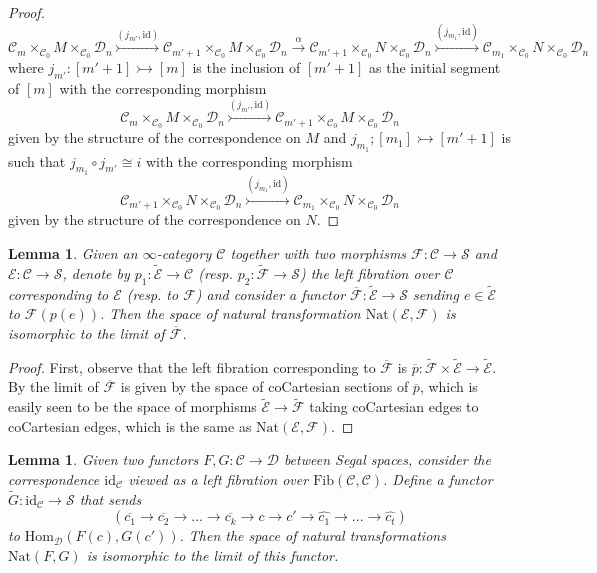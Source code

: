 \documentclass[a4paper, reqno]{amsart}
\newtheorem{lemma}[theorem]{Lemma}
\theoremstyle{definition}
\newcommand\cC{\mathscr C}
\newcommand\cD{\mathscr D}
\newcommand\cE{\mathscr E}
\newcommand\cF{\mathscr F}
\newcommand\cS{\mathscr S}
\newcommand\id{\mathrm{id}}
\newcommand\mor{\mathrm{Hom}}
\newcommand\nat{\mathrm{Nat}}
\newcommand\fib{\mathrm{Fib}}
\begin{document}
\begin{proof}
\[\cC_m\times_{\cC_0}M\times_{\cC_0}\cD_n\overset{(j_{m'},\id)}{\rightarrowtail}\cC_{m'+1}\times_{\cC_0}M\times_{\cC_0}\cD_n\xrightarrow{\alpha}\cC_{m'+1}\times_{\cC_0}N\times_{\cC_0}\cD_n\overset{(j_{m_1},\id)}{\rightarrowtail}\cC_{m_1}\times_{\cC_0}N\times_{\cC_0}\cD_n\]
where $j_{m'}:[m'+1]\rightarrowtail[m]$ is the inclusion of $[m'+1]$ as the initial segment of $[m]$ with the corresponding morphism \[\cC_m\times_{\cC_0}M\times_{\cC_0}\cD_n\overset{(j_{m'},\id)}{\rightarrowtail}\cC_{m'+1}\times_{\cC_0}M\times_{\cC_0}\cD_n\]
given by the structure of the correspondence on $M$ and $j_{m_1};[m_1]\rightarrowtail[m'+1]$ is such that $j_{m_1}\circ j_{m'}\cong i$ with the corresponding morphism \[\cC_{m'+1}\times_{\cC_0}N\times_{\cC_0}\cD_n\overset{(j_{m_1},\id)}{\rightarrowtail}\cC_{m_1}\times_{\cC_0}N\times_{\cC_0}\cD_n\]
given by the structure of the correspondence on $N$. 
\end{proof}
\begin{lemma}\label{lem:nat_1}
Given an $\infty$-category $\cC$ together with two morphisms $\cF:\cC\rightarrow\cS$ and $\cE:\cC\rightarrow\cS$, denote by $p_1:\widetilde{\cE}\rightarrow\cC$ (resp. $p_2:\widetilde{\cF}\rightarrow\cS$) the left fibration over $\cC$ corresponding to $\cE$ (resp. to $\cF$) and consider a functor $\overline{\cF}:\widetilde{\cE}\rightarrow\cS$ sending $e\in\widetilde{\cE}$ to $\cF(p(e))$. Then the space of natural transformation $\nat(\cE,\cF)$ is isomorphic to the limit of $\overline{\cF}$.
\end{lemma}
\begin{proof}
First, observe that the left fibration corresponding to $\overline{\cF}$ is $\overline{p}:\widetilde{\cF}\times\widetilde{\cE}\rightarrow\widetilde{\cE}$. By \cite[Corollary 3.3.3.4.]{lurie2009higher} the limit of $\overline{\cF}$ is given by the space of coCartesian sections of $\overline{p}$, which is easily seen to be the space of morphisms $\widetilde{\cE}\rightarrow\widetilde{\cF}$ taking coCartesian edges to coCartesian edges, which is the same as $\nat(\cE,\cF)$.
\end{proof}
\begin{lemma}\label{lem:nat_2}
Given two functors $F,G:\cC\rightarrow\cD$ between Segal spaces, consider the correspondence $\id_\cC$ viewed as a left fibration over $\fib(\cC,\cC)$. Define a functor $\widetilde{G}:\id_\cC\rightarrow\cS$ that sends \[(\overline{c_1}\rightarrow\overline{c_2}\rightarrow...\rightarrow\overline{c_k}\rightarrow c\rightarrow c'\rightarrow\widehat{c_1}\rightarrow...\rightarrow\widehat{c_t})\]
to $\mor_\cD(F(c),G(c'))$. Then the space of natural transformations $\nat(F,G)$ is isomorphic to the limit of this functor.
\end{lemma}
\end{document}
